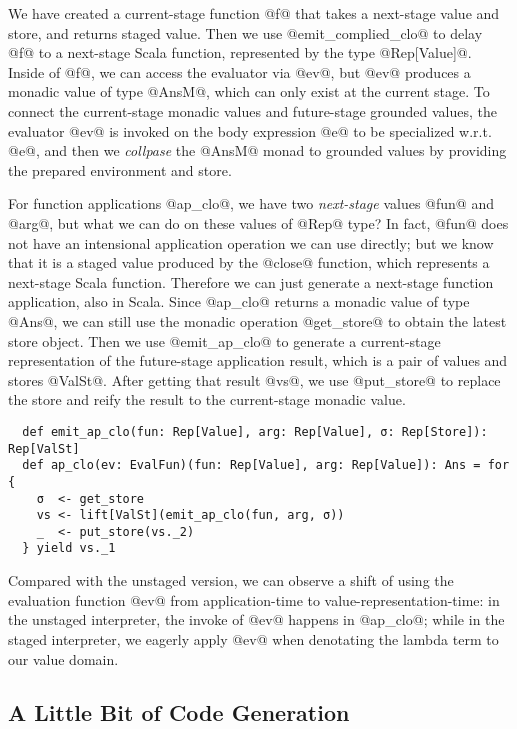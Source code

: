 We have created a current-stage function @f@ that takes a next-stage value and
store, and returns staged value. Then we use @emit_complied_clo@ to delay @f@ to
a next-stage Scala function, represented by the type @Rep[Value]@. Inside of
@f@, we can access the evaluator via @ev@, but @ev@ produces a monadic value of
type @AnsM@, which can only exist at the current stage. To connect the
current-stage monadic values and future-stage grounded values, the evaluator
@ev@ is invoked on the body expression @e@ to be specialized w.r.t. @e@, and
then we \textit{collpase} the @AnsM@ monad to grounded values by providing the
prepared environment and store.

For function applications @ap_clo@, we have two \textit{next-stage} values @fun@
and @arg@, but what we can do on these values of @Rep@ type? In fact, @fun@ does
not have an intensional application operation we can use directly; but we know
that it is a staged value produced by the @close@ function, which represents a
next-stage Scala function. Therefore we can just generate a next-stage function
application, also in Scala. Since @ap_clo@ returns a monadic value of type
@Ans@, we can still use the monadic operation @get_store@ to obtain the latest
store object. Then we use @emit_ap_clo@ to generate a current-stage
representation of the future-stage application result, which is a pair of values
and stores @ValSt@. After getting that result @vs@, we use @put_store@ to
replace the store and reify the result to the current-stage monadic value.

\begin{lstlisting}
  def emit_ap_clo(fun: Rep[Value], arg: Rep[Value], σ: Rep[Store]): Rep[ValSt]
  def ap_clo(ev: EvalFun)(fun: Rep[Value], arg: Rep[Value]): Ans = for {
    σ  <- get_store
    vs <- lift[ValSt](emit_ap_clo(fun, arg, σ))
    _  <- put_store(vs._2)
  } yield vs._1
\end{lstlisting}

Compared with the unstaged version, we can observe a shift of using the
evaluation function @ev@ from application-time to value-representation-time: in
the unstaged interpreter, the invoke of @ev@ happens in @ap_clo@; while in the
staged interpreter, we eagerly apply @ev@ when denotating the lambda term to our
value domain.

\subsection{A Little Bit of Code Generation}

